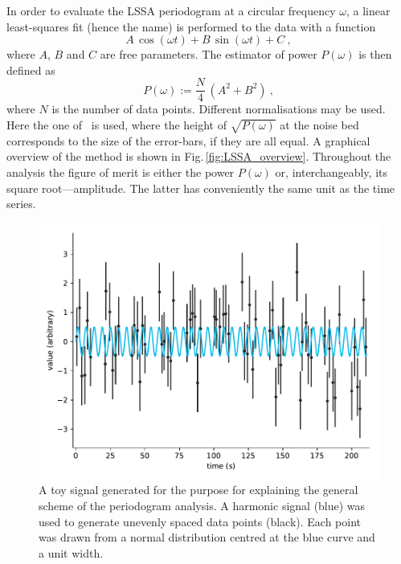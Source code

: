 In order to evaluate the LSSA periodogram at a circular frequency $\omega$, a linear least-squares fit (hence the name) is performed to the data with a function
\begin{equation}
  A\,\cos(\omega t) + B\,\sin(\omega t) + C \ ,
\end{equation}
where $A$, $B$ and $C$ are free parameters. The estimator of power $P(\omega)$ is then defined as
\begin{equation}
  P(\omega) := \frac{N}{4} \, \left( A^2 + B^2 \right) \ ,
\end{equation}
where $N$ is the number of data points. Different normalisations may be used.
Here the one of~\cite{Scargle1982} is used, where the height of $\sqrt{P(\omega)}$ at the noise bed corresponds to the size of the error-bars, if they are all equal. A graphical overview of the method is shown in Fig.\,\ref{fig:LSSA_overview}. Throughout the analysis the figure of merit is either the power $P(\omega)$ or, interchangeably, its square root---amplitude. The latter has conveniently the same unit as the time series.

\begin{figure}
  \centering
  \includegraphics[width=\linewidth]{gfx/axions/basic_signal.pdf}
  \caption{A toy signal generated for the purpose for explaining the general scheme of the periodogram analysis. A harmonic signal (blue) was used to generate unevenly spaced data points (black). Each point was drawn from a normal distribution centred at the blue curve and a unit width.}\label{fig:basic_signal}
\end{figure}

